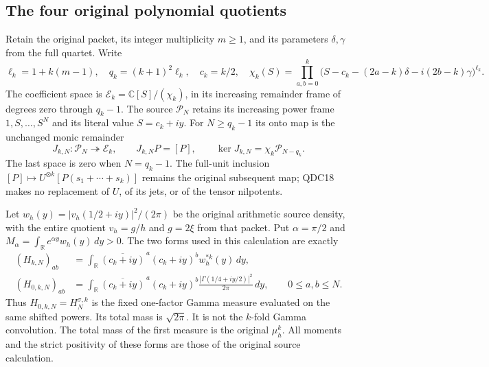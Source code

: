 \subsection{The four original polynomial quotients}

Retain the original packet, its integer multiplicity $m\ge1$,
and its parameters $\delta,\gamma$ from the full quartet.
Write
\[
 \ell_k=1+k(m-1),\quad q_k=(k+1)^2\ell_k,\quad c_k=k/2,\quad
 \chi_k(S)=\prod_{a,b=0}^k
 \bigl(S-c_k-(2a-k)\delta-i(2b-k)\gamma\bigr)^{\ell_k}.
 \tag{QDC17}
\]
The coefficient space is
$\mathcal E_k=\mathbb C[S]/(\chi_k)$, in its increasing
remainder frame of degrees zero through $q_k-1$.
The source $\mathcal P_N$ retains its increasing power frame
$1,S,\ldots,S^N$ and its literal value $S=c_k+iy$.
For $N\ge q_k-1$ its onto map is the unchanged monic remainder
\[
 J_{k,N}:\mathcal P_N\twoheadrightarrow\mathcal E_k,\qquad
 J_{k,N}P=[P],\qquad
 \ker J_{k,N}=\chi_k\mathcal P_{N-q_k}.
 \tag{QDC18}
\]
The last space is zero when $N=q_k-1$. The full-unit inclusion
$[P]\mapsto U^{\otimes k}[P(s_1+\cdots+s_k)]$ remains the
original subsequent map; QDC18 makes no replacement of $U$,
of its jets, or of the tensor nilpotents.

Let $w_h(y)=|v_h(1/2+iy)|^2/(2\pi)$ be the original
arithmetic source density, with the entire quotient $v_h=g/h$
and $g=2\xi$ from that packet. Put $\alpha=\pi/2$ and
$M_\alpha=\int_{\mathbb R}e^{\alpha y}w_h(y)\,dy>0$.
The two forms used in this calculation are exactly
\[
 \begin{split}
 (H_{k,N})_{ab}
 &=\int_{\mathbb R}\overline{(c_k+iy)}^{\,a}(c_k+iy)^b
                    w_h^{*k}(y)\,dy,\\
 (H_{0,k,N})_{ab}
 &=\int_{\mathbb R}\overline{(c_k+iy)}^{\,a}(c_k+iy)^b
       \frac{|\Gamma(1/4+iy/2)|^2}{2\pi}\,dy ,
 \qquad 0\le a,b\le N .
 \end{split}
 \tag{QDC19}
\]
Thus $H_{0,k,N}=H_N^{\sigma,k}$ is the fixed one-factor Gamma
measure evaluated on the same shifted powers. Its total mass
is $\sqrt{2\pi}$. It is not the $k$-fold Gamma convolution.
The total mass of the first measure is the original $\mu_h^k$.
All moments and the strict positivity of these forms are
those of the original source calculation.

